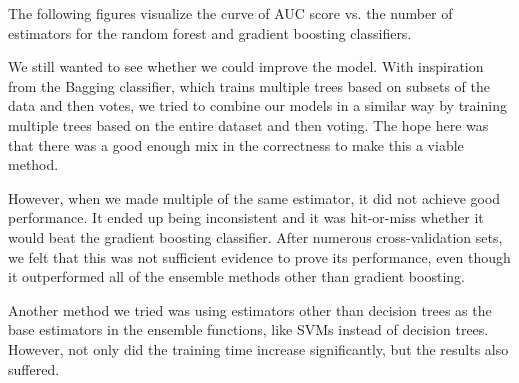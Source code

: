 \documentclass{article} %
\begin{document}
The following figures visualize the curve of AUC score vs. the number of estimators for the random forest and gradient boosting classifiers.

\begin{figure}[h]
    \centering
    \qquad
\end{figure}

We still wanted to see whether we could improve the model.
With inspiration from the Bagging classifier, which trains multiple trees based on subsets of the data and then votes, we tried to combine our models in a similar way by training multiple trees based on the entire dataset and then voting.
The hope here was that there was a good enough mix in the correctness to make this a viable method.

However, when we made multiple of the same estimator, it did not achieve good performance.
It ended up being inconsistent and it was hit-or-miss whether it would beat the gradient boosting classifier.
After numerous cross-validation sets, we felt that this was not sufficient evidence to prove its performance, even though it outperformed all of the ensemble methods other than gradient boosting.

Another method we tried was using estimators other than decision trees as the base estimators in the ensemble functions, like SVMs instead of decision trees.
However, not only did the training time increase significantly, but the results also suffered.
\end{document}
